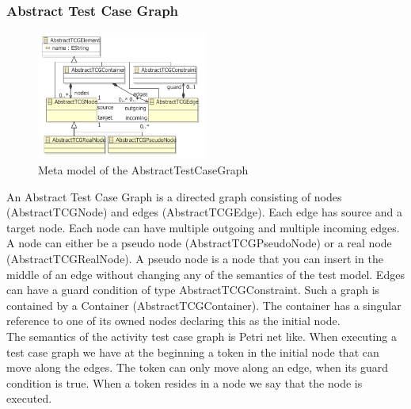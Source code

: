 
\subsubsection{Abstract Test Case Graph}

\begin{figure}
\label{fig:AbstractTCGMetaModel}
\includegraphics[width=0.5\textwidth]{./pics/AbstractTestCaseGraph.pdf}
\caption{Meta model of the AbstractTestCaseGraph}
\end{figure}
An Abstract Test Case Graph is a directed graph consisting of nodes (AbstractTCGNode) and edges (AbstractTCGEdge). Each edge has source and a target node. Each node can have multiple outgoing and multiple incoming edges.
A node can either be a pseudo node (AbstractTCGPseudoNode) or a real node (AbstractTCGRealNode). A pseudo node is a node that you can insert in the middle of an edge without changing any of the semantics of the test model. Edges can have a guard condition of type AbstractTCGConstraint. Such a graph is contained by a Container (AbstractTCGContainer). The container has a singular reference to one of its owned nodes declaring this as the initial node. \\
The semantics of the activity test case graph is Petri net like. When executing a test case graph we have at the beginning a token in the initial node that can move along the edges. The token can only move along an edge, when its guard condition is true. When a token resides in a node we say that the node is executed.

